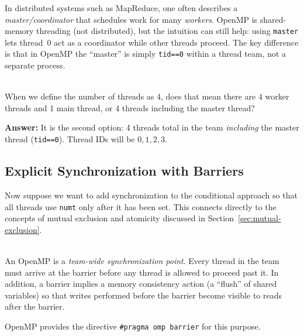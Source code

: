 \begin{ppexample}
 In distributed systems such as MapReduce, one often describes a \emph{master/coordinator} that schedules work for many \emph{workers}. OpenMP is shared-memory threading (not distributed), but the intuition can still help: using \texttt{master} lets thread~0 act as a coordinator while other threads proceed. The key difference is that in OpenMP the ``master'' is simply \texttt{tid==0} within a thread team, not a separate process.
\end{ppexample}


\begin{ppquestion}
\\When we define the number of threads as 4, does that mean there are 4 worker threads and 1 main thread, or 4 threads including the master thread?

\textbf{Answer:} It is the second option: 4 threads total in the team \emph{including} the master thread (\texttt{tid==0}). Thread IDs will be $0, 1, 2, 3$.
\end{ppquestion}
\subsection{Explicit Synchronization with Barriers}
\label{sec:barriers}

Now suppose we want to add synchronization to the conditional approach so that all threads use \texttt{numt} only after it has been set. This connects directly to the concepts of mutual exclusion and atomicity discussed in Section~\ref{sec:mutual-exclusion}.

\begin{ppdefn}
\\An OpenMP  is a \emph{team-wide synchronization point}. Every thread in the team must arrive at the barrier before any thread is allowed to proceed past it. In addition, a barrier implies a memory consistency action (a ``flush'' of shared variables) so that writes performed before the barrier become visible to reads after the barrier.
\end{ppdefn}


OpenMP provides the directive \texttt{\#pragma omp barrier} for this purpose.

